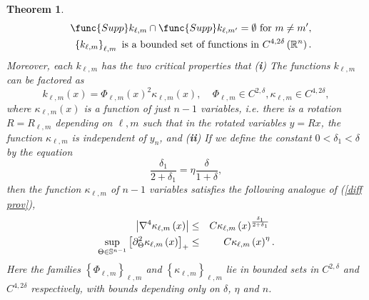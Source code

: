 \documentclass{amsart}
\newtheorem{theorem}{Theorem}[section]
\theoremstyle{plain}
\numberwithin{equation}{section}
\begin{document}
\begin{theorem}
\begin{eqnarray}
&&\func{Supp}k_{\ell ,m}\cap \func{Supp}k_{\ell ,m^{\prime }}=\emptyset 
\text{ for }m\neq m^{\prime },  \notag \\
&&\left\{ k_{\ell ,m}\right\} _{\ell ,m}\text{ is a bounded set of functions
in }C^{4,2\delta }\left( \mathbb{R}^{n}\right) .  \notag
\end{eqnarray}%
Moreover, each $k_{\ell ,m}$ has the two critical properties that\newline
(\textbf{i}) The functions $k_{\ell ,m}$ can be factored as%
\begin{equation*}
k_{\ell ,m}\left( x\right) =\Phi _{\ell ,m}\left( x\right) ^{2}\kappa _{\ell
,m}\left( x\right) ,\ \ \ \ \ \Phi _{\ell ,m}\in C^{2,\delta },\kappa _{\ell
,m}\in C^{4,2\delta },
\end{equation*}%
where $\kappa _{\ell ,m}\left( x\right) $ is a function of just $n-1$
variables, i.e. there is a rotation $R=R_{\ell ,m}$ depending on $\ell ,m$
such that in the rotated variables $y=Rx$, the function $\kappa _{\ell ,m}$
is \emph{independent} of $y_{n}$, and\newline
(\textbf{ii}) If we define the constant $0<\delta _{1}<\delta $ by the
equation%
\begin{equation*}
\frac{\delta _{1}}{2+\delta _{1}}=\eta \frac{\delta }{1+\delta },
\end{equation*}%
then the function $\kappa _{\ell ,m}$ of $n-1$ variables satisfies the
following analogue of (\ref{diff prov}),%
\begin{eqnarray}
\left\vert \nabla ^{4}\kappa _{\ell ,m}\left( x\right) \right\vert  &\leq
&C\kappa _{\ell ,m}\left( x\right) ^{\frac{\delta _{1}}{2+\delta _{1}}}\text{
}  \label{diff prov next} \\
\sup_{\Theta \in \mathbb{S}^{n-1}}\left[ \partial _{\Theta }^{2}\kappa
_{\ell ,m}\left( x\right) \right] _{+} &\leq &C\kappa _{\ell ,m}\left(
x\right) ^{\eta }.  \notag
\end{eqnarray}%
\newline
Here the families $\left\{ \Phi _{\ell ,m}\right\} _{\ell ,m}$ and $\left\{
\kappa _{\ell ,m}\right\} _{\ell ,m}$ lie in bounded sets in $C^{2,\delta }$
and $C^{4,2\delta }$ respectively, with bounds depending only on $\delta $, $%
\eta $ and $n$.
\end{theorem}
\end{document}

